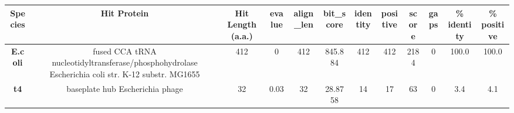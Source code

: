 \begin{tabular}{|c|c|c|c|c|c|c|c|c|c|c|c|} \hline
\textbf{Species} & \textbf{Hit Protein} & \textbf{Hit Length (a.a.)} & \textbf{evalue} & \textbf{align\_len} & \textbf{bit\_score} & \textbf{identity} & \textbf{positive} & \textbf{score} & \textbf{gaps} & \textbf{\% identity} & \textbf{\% positive} \\ \hline
\textbf{E.coli} & fused CCA tRNA nucleotidyltransferase/phosphohydrolase Escherichia coli str. K-12 substr. MG1655 & 412 & 0 & 412 & 845.884 & 412 & 412 & 2184 & 0 & 100.0 & 100.0\\
\textbf{t4} & baseplate hub Escherichia phage  & 32 & 0.03 & 32 & 28.8758 & 14 & 17 & 63 & 0 & 3.4 & 4.1\\
\hline \end{tabular}
